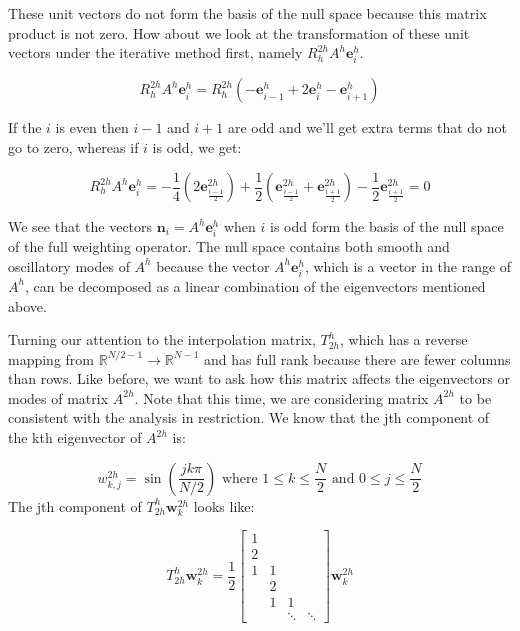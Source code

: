 \documentclass[pdftex,12pt,a4paper]{article}
\begin{document}
These unit vectors do not form the basis of the null space because this matrix product is not zero.  How about we look at the transformation of these unit vectors under the iterative method first, namely  $R_h^{2h}A^h \mathbf{e}_i^h$.  

\begin{equation}
R_h^{2h}A^h \mathbf{e}_i^h = R_h^{2h} \left( - \mathbf{e}_{i-1}^h + 2 \mathbf{e}_{i}^h - \mathbf{e}_{i+1}^h \right)
\end{equation}

If the $i$ is even then $i-1$ and $i+1$ are odd and we'll get extra terms that do not go to zero, whereas if $i$ is odd, we get: 

\begin{equation}
R_h^{2h}A^h \mathbf{e}_i^h =  -\frac 1 4 \left( 2 \mathbf{e}_{\frac{i-1}{2}}^{2h} \right) + \frac 1 2 \left( \mathbf{e}_{\frac{i-1}{2}}^{2h} + \mathbf{e}_{\frac{i+1}{2}}^{2h} \right) - \frac 1 2 \mathbf{e}_{ \frac{i+1}{2}}^{2h} = 0 
\end{equation}

We see that the vectors $\mathbf{n}_i = A^h \mathbf{e}_i^h$ when $i$ is odd form the basis of the null space of the full weighting operator.  The null space contains both smooth and oscillatory modes of $A^h$ because the vector $A^h \mathbf{e}_i^h$, which is a vector in the range of $A^h$, can be decomposed as a linear combination of the eigenvectors mentioned above.  


Turning our attention to the interpolation matrix, $T_{2h}^h$, which has a reverse mapping from $\mathbb{R}^{N/2 - 1} \rightarrow \mathbb{R}^{N-1}$ and has full rank because there are fewer columns than rows. Like before, we want to ask how this matrix affects the eigenvectors or modes of matrix $A^{2h}$.  Note that this time, we are considering matrix $A^{2h}$ to be consistent with the analysis in restriction.  We know that the jth component of the kth eigenvector of $A^{2h}$ is: 

$$
w_{k,j}^{2h} = \sin \left( \frac{jk \pi}{N /2 } \right) \text{ where } 1 \leq k \leq \frac N 2 \text{ and } 0 \leq j \leq \frac N 2
$$
The jth component of $T_{2h}^h \mathbf{w}_{k}^{2h}$ looks like: 

$$ 
T_{2h}^h \mathbf{w}_k^{2h} = \frac 1 2 \begin{bmatrix} 1 \\ 2 \\ 1 & 1 \\ & 2 \\ & 1 & 1 \\ & & \ddots & \ddots  \end{bmatrix} \mathbf{w}_k^{2h}
$$
\end{document}
